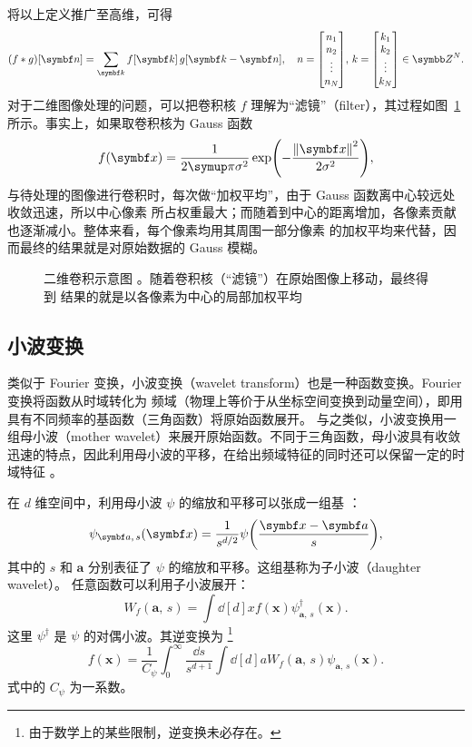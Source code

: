 将以上定义推广至高维，可得
\begin{equation}
  (f \ast g) [\bm{n}] = \sum_{\bm{k}} f[\bm{k}] \, g[\bm{k}-\bm{n}] \qc
  n=\mqty[n_1 \\ n_2 \\ \vdots \\ n_N], \, k=\mqty[k_1 \\ k_2 \\ \vdots \\ k_N] \in \Z^N.
\end{equation}
对于二维图像处理的问题，可以把卷积核 $f$ 理解为“滤镜”（filter），其过程如图~\ref{fig:convolution}
所示。事实上，如果取卷积核为 Gauss 函数
\begin{equation}
  f(\bm{x}) = \frac{1}{2\pp\sigma^2} \exp(-\frac{\norm{\bm{x}}^2}{2\sigma^2}),
\end{equation}
与待处理的图像进行卷积时，每次做“加权平均”，由于 Gauss 函数离中心较远处收敛迅速，所以中心像素
所占权重最大；而随着到中心的距离增加，各像素贡献也逐渐减小。整体来看，每个像素均用其周围一部分像素
的加权平均来代替，因而最终的结果就是对原始数据的 Gauss 模糊。

\begin{figure}[htb]
  \centering
  \caption{二维卷积示意图 \cite{liamconvolution}。随着卷积核（“滤镜”）在原始图像上移动，最终得到
    结果的就是以各像素为中心的局部加权平均}
  \label{fig:convolution}
\end{figure}

\subsection{小波变换}

类似于 Fourier 变换，小波变换（wavelet transform）也是一种函数变换。Fourier 变换将函数从时域转化为
频域（物理上等价于从坐标空间变换到动量空间），即用具有不同频率的基函数（三角函数）将原始函数展开。
与之类似，小波变换用一组母小波（mother wavelet）来展开原始函数。不同于三角函数，母小波具有收敛
迅速的特点，因此利用母小波的平移，在给出频域特征的同时还可以保留一定的时域特征 \cite{wiki:wavelet}。

在 $d$ 维空间中，利用母小波 $\psi$ 的缩放和平移可以张成一组基 \cite{wiki:wavelet,padic}：
\begin{equation}
  \label{eq:daughter-wavelet}
  \psi_{\bm{a},\,s}(\bm{x}) = \frac{1}{s^{d/2}} \psi\qty(\frac{\bm{x}-\bm{a}}{s}),
\end{equation}
其中的 $s$ 和 $\bm{a}$ 分别表征了 $\psi$ 的缩放和平移。这组基称为子小波（daughter wavelet）。
任意函数可以利用子小波展开：
\begin{equation}
  W_f(\bm{a},\,s) = \int \dd[d]{x} f(\bm{x}) \psi^\dagger_{\bm{a},\,s}(\bm{x}).
\end{equation}
这里 $\psi^\dagger$ 是 $\psi$ 的对偶小波。其逆变换为
\footnote{由于数学上的某些限制，逆变换未必存在。}
\begin{equation}
  f(\bm{x}) = \frac{1}{C_\psi} \int_0^\infty \frac{\dd{s}}{s^{d+1}}
              \int \dd[d]{a} W_f(\bm{a},\,s) \psi_{\bm{a},\,s}(\bm{x}).
\end{equation}
式中的 $C_\psi$ 为一系数。

